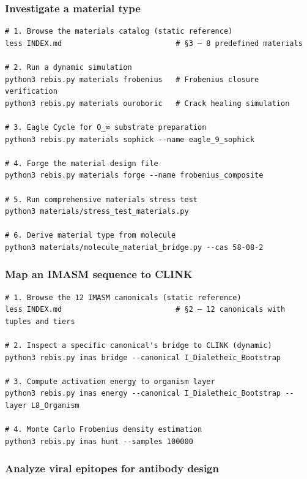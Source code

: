 \hypertarget{investigate-a-material-type}{%
\subsubsection{Investigate a material
type}\label{investigate-a-material-type}}

\begin{verbatim}
# 1. Browse the materials catalog (static reference)
less INDEX.md                          # §3 — 8 predefined materials

# 2. Run a dynamic simulation
python3 rebis.py materials frobenius   # Frobenius closure verification
python3 rebis.py materials ouroboric   # Crack healing simulation

# 3. Eagle Cycle for O_∞ substrate preparation
python3 rebis.py materials sophick --name eagle_9_sophick

# 4. Forge the material design file
python3 rebis.py materials forge --name frobenius_composite

# 5. Run comprehensive materials stress test
python3 materials/stress_test_materials.py

# 6. Derive material type from molecule
python3 materials/molecule_material_bridge.py --cas 58-08-2
\end{verbatim}

\hypertarget{map-an-imasm-sequence-to-clink}{%
\subsubsection{Map an IMASM sequence to
CLINK}\label{map-an-imasm-sequence-to-clink}}

\begin{verbatim}
# 1. Browse the 12 IMASM canonicals (static reference)
less INDEX.md                          # §2 — 12 canonicals with tuples and tiers

# 2. Inspect a specific canonical's bridge to CLINK (dynamic)
python3 rebis.py imas bridge --canonical I_Dialetheic_Bootstrap

# 3. Compute activation energy to organism layer
python3 rebis.py imas energy --canonical I_Dialetheic_Bootstrap --layer L8_Organism

# 4. Monte Carlo Frobenius density estimation
python3 rebis.py imas hunt --samples 100000
\end{verbatim}

\hypertarget{analyze-viral-epitopes-for-antibody-design}{%
\subsubsection{Analyze viral epitopes for antibody
design}\label{analyze-viral-epitopes-for-antibody-design}}


